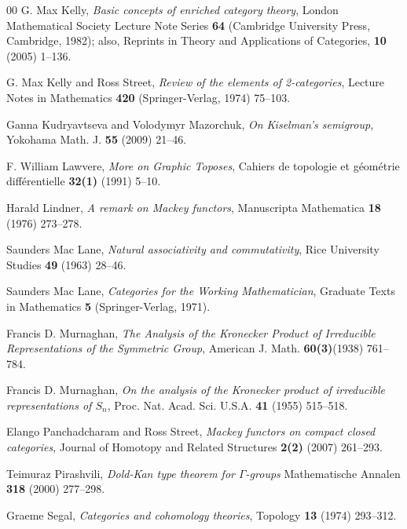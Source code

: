 \documentclass[a4paper,12pt,reqno]{amsart}
\theoremstyle{definition}
\theoremstyle{fact}
\theoremstyle{genquest}
\theoremstyle{step}
\begin{document}
\begin{thebibliography}{00}
 G. Max Kelly, \textit{Basic concepts of enriched category theory}, London Mathematical Society Lecture Note Series \textbf{64} (Cambridge University Press, Cambridge, 1982); also, Reprints in Theory and Applications of Categories, \textbf{10} (2005) 1--136. \label{KellyBook}

 G. Max Kelly and Ross Street, \textit{Review of the elements of 2-categories}, Lecture Notes in Mathematics \textbf{420} (Springer-Verlag, 1974) 75--103.\label{KelSt1974}

 Ganna Kudryavtseva and Volodymyr Mazorchuk, 
\textit{On Kiselman's semigroup}, Yokohama Math. J. \textbf{55} (2009) 21--46.\label{KM09} 

 F. William Lawvere, \textit{More on Graphic Toposes}, Cahiers de topologie et g\'eom\'etrie diff\'erentielle \textbf{32(1)} (1991) 5--10.\label{Law91}

 Harald Lindner, \textit{A remark on Mackey functors}, 
Manuscripta Mathematica \textbf{18} (1976) 273--278.\label{Lindner1976}

 Saunders Mac Lane, \textit{Natural associativity and commutativity}, 
Rice University Studies \textbf{49} (1963) 28--46.\label{ML1963}

 Saunders Mac Lane, \textit{Categories for the Working Mathematician}, 
Graduate Texts in Mathematics \textbf{5} (Springer-Verlag, 1971).\label{CWM} 

 Francis D. Murnaghan, \textit{The Analysis of the Kronecker Product of Irreducible Representations of the Symmetric Group}, American J. Math. \textbf{60(3)}(1938) 761--784.\label{Mur38}

 Francis D. Murnaghan, \textit{On the analysis of the Kronecker product of irreducible representations of $S_n$}, Proc. Nat. Acad. Sci. U.S.A. \textbf{41} (1955) 515--518.\label{Mur55}

 Elango Panchadcharam and Ross Street, \textit{Mackey functors on compact closed categories}, Journal of Homotopy and Related Structures \textbf{2(2)} (2007) 261--293.\label{PanSt}

 Teimuraz Pirashvili, \textit{Dold-Kan type theorem for $\Gamma$-groups}  
Mathematische Annalen \textbf{318} (2000) 277--298.\label{Pirash00}

 Graeme Segal, \textit{Categories and cohomology theories}, 
Topology \textbf{13} (1974) 293--312.\label{Segal}


\end{thebibliography}
\end{document}
